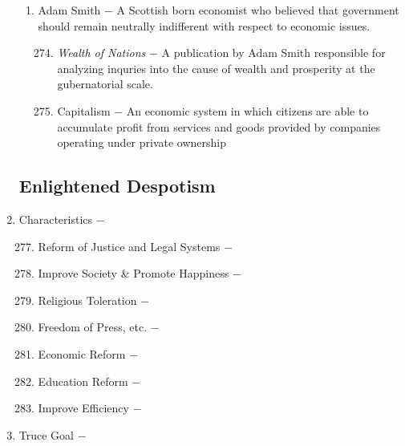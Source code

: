 \documentclass[12pt]{article}
\begin{document}
\begin{enumerate}
\begin{enumerate}[label=\arabic{*}.]
\item Adam Smith $-$ A Scottish born economist who believed that government should remain neutrally indifferent with respect to economic issues.

\begin{enumerate}[label=\arabic{*}.]
\setcounter{enumiii}{273}

\item \textit{Wealth of Nations} $-$ A publication by Adam Smith responsible for analyzing inquries into the cause of wealth and prosperity at the gubernatorial scale.

\item Capitalism $-$ An economic system in which citizens are able to accumulate profit from services and goods provided by companies operating under private ownership

\end{enumerate}

\end{enumerate}
\setcounter{enumi}{275}

\subsection{Enlightened Despotism}

\item Characteristics $-$

\begin{enumerate}[label=\arabic{*}.]
\setcounter{enumii}{276}

\item Reform of Justice and Legal Systems $-$ 

\item Improve Society \& Promote Happiness $-$

\item Religious Toleration $-$

\item Freedom of Press, etc. $-$ 

\item Economic Reform $-$ 

\item Education Reform $-$ 

\item Improve Efficiency $-$ 


\end{enumerate}
\setcounter{enumi}{283}

\item Truce Goal $-$


\end{enumerate}
\end{document}
